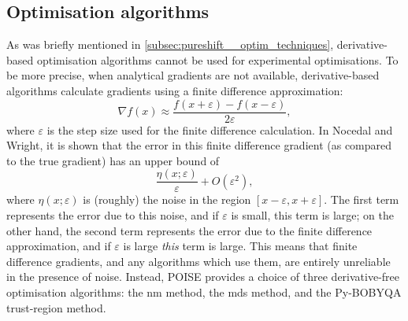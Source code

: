 \subsection{Optimisation algorithms}
\label{subsec:poise__algorithms}

As was briefly mentioned in \cref{subsec:pureshift__optim_techniques}, derivative-based optimisation algorithms cannot be used for experimental optimisations.
To be more precise, when analytical gradients are not available, derivative-based algorithms calculate gradients using a finite difference approximation:
\begin{equation}
    \label{eq:finite_difference_grad}
    \nabla f(x) \approx \frac{f(x + \varepsilon) - f(x - \varepsilon)}{2\varepsilon},
\end{equation}
where $\varepsilon$ is the step size used for the finite difference calculation.
In Nocedal and Wright\autocite{Nocedal2006}, it is shown that the error in this finite difference gradient (as compared to the true gradient) has an upper bound of
\begin{equation}
    \label{eq:finite_difference_error}
    \frac{\eta(x;\varepsilon)}{\varepsilon} + O(\varepsilon^2),
\end{equation}
where $\eta(x;\varepsilon)$ is (roughly) the noise in the region $[x - \varepsilon, x + \varepsilon]$.
The first term represents the error due to this noise, and if $\varepsilon$ is small, this term is large;
on the other hand, the second term represents the error due to the finite difference approximation, and if $\varepsilon$ is large \textit{this} term is large.
This means that finite difference gradients, and any algorithms which use them, are entirely unreliable in the presence of noise.
Instead, POISE provides a choice of three derivative-free optimisation algorithms: the \acf{nm} method\autocite{Nelder1965TCJ}, the \acf{mds} method\autocite{Torczon1989,DennisJr1991SIAMJO}, and the Py-BOBYQA trust-region method\autocite{Powell2009Proc,Cartis2019ACMTMS}.





